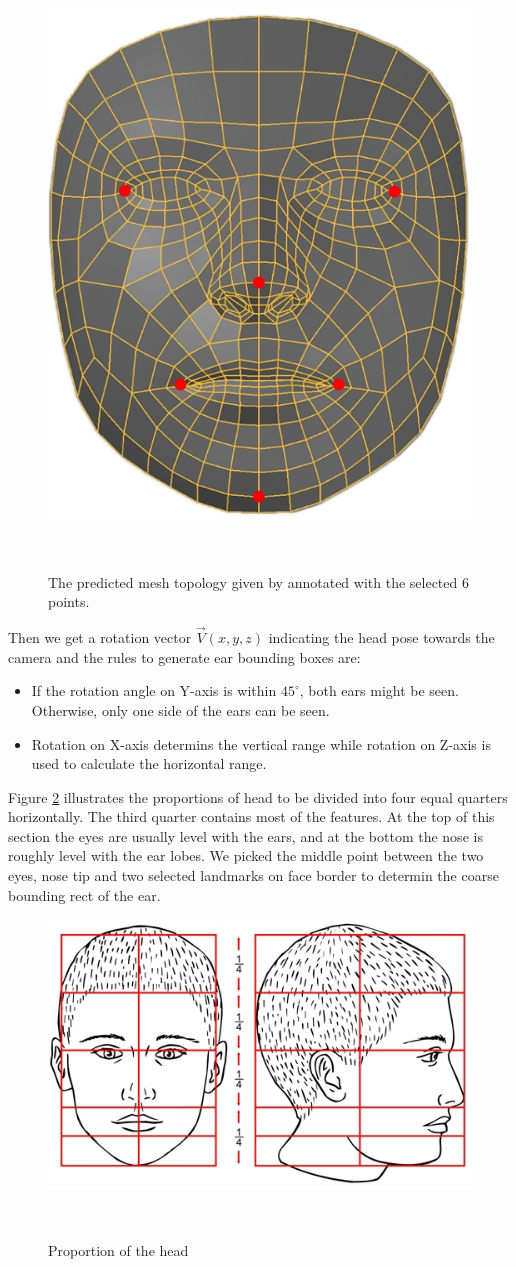 \begin{figure}
  \centering
    \includegraphics[width=0.5\columnwidth]{figures/pose_estimation_mesh.jpg}
    \caption{The predicted mesh topology given by\cite{kartynnik2019real} annotated with the selected 6 points.}~\label{fig:pose-estimation}
  \end{figure}
Then we get a rotation vector $\vec{V}(x, y, z)$ indicating the head pose towards the camera and the rules to generate ear bounding boxes are:
\begin{itemize}
  \item If the rotation angle on Y-axis is within $45^{\circ}$, both ears might be seen. Otherwise, only one side of the ears can be seen.
  \item Rotation on X-axis determins the vertical range while rotation on Z-axis is used to calculate the horizontal range.
\end{itemize}
Figure \ref{fig:head-proportion} illustrates the proportions of head to be divided into four equal quarters horizontally. The third quarter contains most of the features. At the top of this section the eyes are usually level with the ears, and at the bottom the nose is roughly level with the ear lobes. We picked the middle point between the two eyes, nose tip and two selected landmarks on face border to determin the coarse bounding rect of the ear.
\begin{figure}
  \centering
    \includegraphics[width=0.9\columnwidth]{figures/proportions_of_head.jpg}
    \caption{Proportion of the head\cite{headproportionwebsite}}~\label{fig:head-proportion}
  \end{figure}
